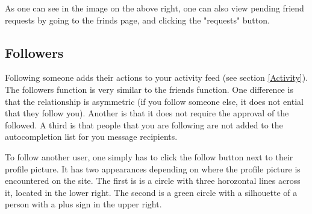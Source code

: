 \documentclass[10pt]{article}
\begin{document}
\begin{flushleft}
As one can see in the image on the above right, one can also view pending friend requests by going to the frinds page, and clicking the "requests" button. 
\end{flushleft}


\subsection{Followers}
\begin{flushleft}
Following someone adds their actions to your activity feed (see section \ref{Activity}). The followers function is very similar to the friends function.  One difference is that the relationship is asymmetric (if you follow someone else, it does not ential that they follow you).  Another is that it does not require the approval of the followed.  A third is that people that you are following are not added to the autocompletion list for you message recipients.  
\end{flushleft}


\begin{flushleft}
To follow another user, one simply has to click the follow button next to their profile picture.  It has two appearances depending on where the profile picture is encountered on the site.  The first is is a circle with three horozontal lines across it, located in the lower right.  The second is a green circle with a silhouette of a person with a plus sign in the upper right.   
\end{flushleft}
\end{document}
